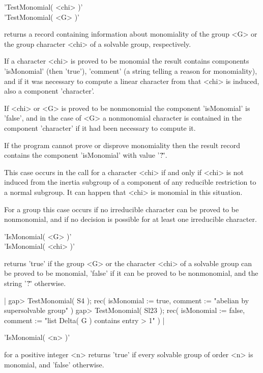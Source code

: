 'TestMonomial( <chi> )'\\
'TestMonomial(  <G>  )'

returns a record containing information about monomiality of the group <G>
or the group character <chi> of a solvable group, respectively.

If a character <chi> is proved to be monomial the result contains
components 'isMonomial' (then 'true'), 'comment' (a string telling a
reason for monomiality), and if it was necessary to compute a linear
character from that <chi> is induced, also a component 'character'.

If <chi> or <G> is proved to be nonmonomial the component 'isMonomial'
is 'false', and in the case of <G> a nonmonomial character is contained
in the component 'character' if it had been necessary to compute it.

If the program cannot prove or disprove monomiality then the result
record contains the component 'isMonomial' with value '\"?\"'.

This case occurs in the call for a character <chi> if and only if
<chi> is not induced from the inertia subgroup of a component of any
reducible restriction to a normal subgroup.  It can happen that <chi>
is monomial in this situation.

For a group this case occurs if no irreducible character can be proved
to be nonmonomial, and if no decision is possible for at least one
irreducible character.

\vspace{3mm}

'IsMonomial( <G> )'%
\\
'IsMonomial( <chi> )'%

returns 'true' if the group <G> or the character <chi> of a solvable group
can be proved to be monomial, 'false' if it can be proved to be nonmonomial,
and the string '\"?\"' otherwise.

|    gap> TestMonomial( S4 );
    rec(
      isMonomial := true,
      comment := "abelian by supersolvable group" )
    gap> TestMonomial( Sl23 );
    rec(
      isMonomial := false,
      comment := "list Delta( G ) contains entry > 1" ) |

\vspace{3mm}

'IsMonomial( <n> )'%

for a positive integer <n> returns 'true' if every solvable group of order
<n> is monomial, and 'false' otherwise.

